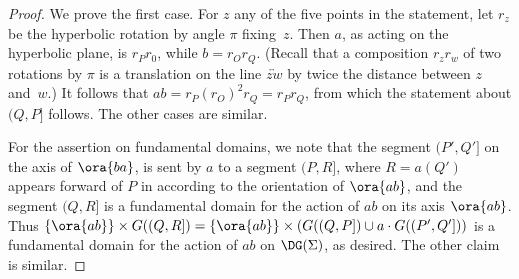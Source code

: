 \begin{proof}
  We prove the first case.
  For $z$ any of the five points in the statement, let $r_z$ be
  the hyperbolic rotation by angle $\pi$ fixing~$z$. Then $a$, as
  acting on the hyperbolic plane, is $r_P r_0$, while $b = r_O r_Q$.
  (Recall that a composition $r_zr_w$ of two rotations by $\pi$ is a
  translation on the line $\overleftrightarrow{zw}$ by twice the
  distance between $z$ and~$w$.)
  It follows that $ab = r_P (r_O)^2 r_Q =
  r_Pr_Q$, from which the statement about $(Q,P]$
  follows. The other cases are similar.

For the assertion on fundamental domains, we note that the segment
$(P',Q']$ on the axis of $\ora{ba}$, is sent by $a$ to a segment
$(P,R]$, where $R=a(Q')$ appears forward of $P$ in according to the
orientation of $\ora{ab}$, and the segment $(Q,R]$ is a fundamental
domain for the action of $ab$ on its axis $\ora{ab}$. Thus $\{
\ora{ab} \} \times G((Q,R])= \{ \ora{ab} \} \times  (G((Q,P]) \cup a
\cdot G((P',Q']))$ is a fundamental domain for the action of $ab$ on
$\DG(\Sigma)$, as desired.
The other claim is similar.
\end{proof}

